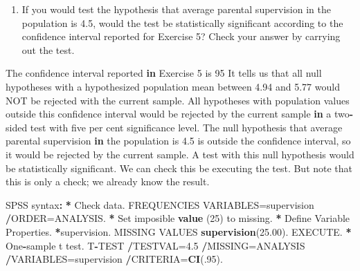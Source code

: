 \documentclass[a4paper]{book}
\newenvironment{Shaded}{\begin{snugshade}}{\end{snugshade}}
\newcommand{\KeywordTok}[1]{\textcolor[rgb]{0,0,0}{\textbf{#1}}}
\newcommand{\DecValTok}[1]{\textcolor[rgb]{0.00,0.00,0.00}{#1}}
\newcommand{\FloatTok}[1]{\textcolor[rgb]{0.00,0.00,0.00}{#1}}
\newcommand{\StringTok}[1]{\textcolor[rgb]{0.00,0.00,0.00}{#1}}
\newcommand{\ControlFlowTok}[1]{\textcolor[rgb]{0.00,0.00,0.00}{\textbf{#1}}}
\newcommand{\OperatorTok}[1]{\textcolor[rgb]{0.00,0.00,0.00}{\textbf{#1}}}
\newcommand{\ErrorTok}[1]{\textcolor[rgb]{0.00,0.00,0.00}{\textbf{#1}}}
\newcommand{\NormalTok}[1]{#1}
\providecommand{\tightlist}{%
  \setlength{\itemsep}{0pt}\setlength{\parskip}{0pt}}
\theoremstyle{definition}
\theoremstyle{definition}
\theoremstyle{definition}
\theoremstyle{remark}
\begin{document}
\begin{enumerate}
\def\labelenumi{\arabic{enumi}.}
\setcounter{enumi}{5}
\tightlist
\item
  If you would test the hypothesis that average parental supervision in
  the population is 4.5, would the test be statistically significant
  according to the confidence interval reported for Exercise 5? Check
  your answer by carrying out the test.
\end{enumerate}

\begin{Shaded}
\begin{Highlighting}[]
\NormalTok{The confidence interval reported }\ControlFlowTok{in}\NormalTok{ Exercise }\DecValTok{5}\NormalTok{ is }\DecValTok{95}\NormalTok{%
\NormalTok{It tells us that all null hypotheses with a hypothesized population mean}
\NormalTok{between }\FloatTok{4.94}\NormalTok{ and }\FloatTok{5.77}\NormalTok{ would NOT be rejected with the current sample. All}
\NormalTok{hypotheses with population values outside this confidence interval would be}
\NormalTok{rejected by the current sample }\ControlFlowTok{in}\NormalTok{ a two}\OperatorTok{-}\NormalTok{sided test with five per cent}
\NormalTok{significance level.}
\NormalTok{The null hypothesis that average parental supervision }\ControlFlowTok{in}\NormalTok{ the population is }\FloatTok{4.5}
\NormalTok{is outside the confidence interval, so it would be rejected by the current}
\NormalTok{sample. A test with this null hypothesis would be statistically significant.}
\NormalTok{We can check this be executing the test. But note that this is only a check; we}
\NormalTok{already know the result.}

\NormalTok{SPSS syntax}\OperatorTok{:}\StringTok{  }
\StringTok{  }
\ErrorTok{*}\StringTok{ }\NormalTok{Check data.  }
\NormalTok{FREQUENCIES VARIABLES=supervision  }
  \OperatorTok{/}\NormalTok{ORDER=ANALYSIS.  }
\OperatorTok{*}\StringTok{ }\NormalTok{Set imposible }\KeywordTok{value}\NormalTok{ (}\DecValTok{25}\NormalTok{) to missing.  }
\OperatorTok{*}\StringTok{ }\NormalTok{Define Variable Properties.  }
\OperatorTok{*}\NormalTok{supervision.  }
\NormalTok{MISSING VALUES }\KeywordTok{supervision}\NormalTok{(}\FloatTok{25.00}\NormalTok{).  }
\NormalTok{EXECUTE.  }
\OperatorTok{*}\StringTok{ }\NormalTok{One}\OperatorTok{-}\NormalTok{sample t test.  }
\NormalTok{T}\OperatorTok{-}\NormalTok{TEST  }
  \OperatorTok{/}\NormalTok{TESTVAL=}\FloatTok{4.5}  
  \OperatorTok{/}\NormalTok{MISSING=ANALYSIS  }
  \OperatorTok{/}\NormalTok{VARIABLES=supervision  }
  \OperatorTok{/}\NormalTok{CRITERIA=}\KeywordTok{CI}\NormalTok{(.}\DecValTok{95}\NormalTok{).  }
  
}
\end{Highlighting}
\end{Shaded}
\end{document}
